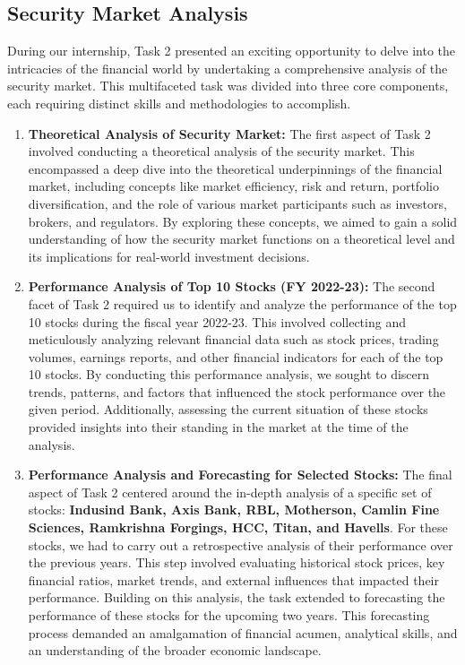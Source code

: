 \subsection{Security Market Analysis}

During our internship, Task 2 presented an exciting opportunity to delve into the intricacies of the financial world by undertaking a comprehensive analysis of the security market. This multifaceted task was divided into three core components, each requiring distinct skills and methodologies to accomplish.

\begin{enumerate}
    \item \textbf{Theoretical Analysis of Security Market:} The first aspect of Task 2 involved conducting a theoretical analysis of the security market. This encompassed a deep dive into the theoretical underpinnings of the financial market, including concepts like market efficiency, risk and return, portfolio diversification, and the role of various market participants such as investors, brokers, and regulators. By exploring these concepts, we aimed to gain a solid understanding of how the security market functions on a theoretical level and its implications for real-world investment decisions.

    \item \textbf{Performance Analysis of Top 10 Stocks (FY 2022-23):} The second facet of Task 2 required us to identify and analyze the performance of the top 10 stocks during the fiscal year 2022-23. This involved collecting and meticulously analyzing relevant financial data such as stock prices, trading volumes, earnings reports, and other financial indicators for each of the top 10 stocks. By conducting this performance analysis, we sought to discern trends, patterns, and factors that influenced the stock performance over the given period. Additionally, assessing the current situation of these stocks provided insights into their standing in the market at the time of the analysis.

    \item \textbf{Performance Analysis and Forecasting for Selected Stocks:} The final aspect of Task 2 centered around the in-depth analysis of a specific set of stocks: \textbf{Indusind Bank, Axis Bank, RBL, Motherson, Camlin Fine Sciences, Ramkrishna Forgings, HCC, Titan, and Havells}. For these stocks, we had to carry out a retrospective analysis of their performance over the previous years. This step involved evaluating historical stock prices, key financial ratios, market trends, and external influences that impacted their performance. Building on this analysis, the task extended to forecasting the performance of these stocks for the upcoming two years. This forecasting process demanded an amalgamation of financial acumen, analytical skills, and an understanding of the broader economic landscape.
\end{enumerate}

